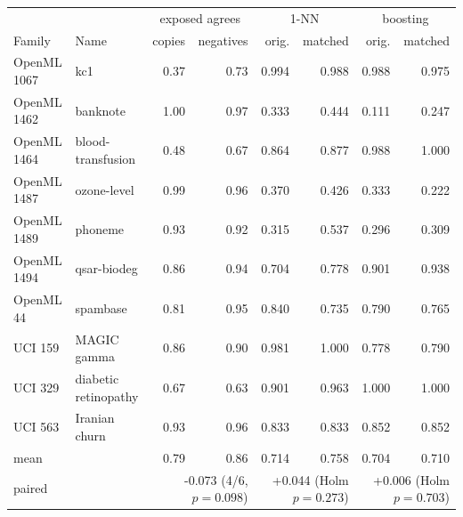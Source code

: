 \begin{tabular}{llrrrrrr}\toprule
 & & \multicolumn{2}{c}{exposed agrees} & \multicolumn{2}{c}{1-NN} & \multicolumn{2}{c}{boosting}\\
Family & Name & copies & negatives & orig. & matched & orig. & matched\\\midrule
OpenML 1067 & kc1 & 0.37 & 0.73 & 0.994 & 0.988 & 0.988 & 0.975\\
OpenML 1462 & banknote & 1.00 & 0.97 & 0.333 & 0.444 & 0.111 & 0.247\\
OpenML 1464 & blood-transfusion & 0.48 & 0.67 & 0.864 & 0.877 & 0.988 & 1.000\\
OpenML 1487 & ozone-level & 0.99 & 0.96 & 0.370 & 0.426 & 0.333 & 0.222\\
OpenML 1489 & phoneme & 0.93 & 0.92 & 0.315 & 0.537 & 0.296 & 0.309\\
OpenML 1494 & qsar-biodeg & 0.86 & 0.94 & 0.704 & 0.778 & 0.901 & 0.938\\
OpenML 44 & spambase & 0.81 & 0.95 & 0.840 & 0.735 & 0.790 & 0.765\\
UCI 159 & MAGIC gamma & 0.86 & 0.90 & 0.981 & 1.000 & 0.778 & 0.790\\
UCI 329 & diabetic retinopathy & 0.67 & 0.63 & 0.901 & 0.963 & 1.000 & 1.000\\
UCI 563 & Iranian churn & 0.93 & 0.96 & 0.833 & 0.833 & 0.852 & 0.852\\
\midrule mean & & 0.79 & 0.86 & 0.714 & 0.758 & 0.704 & 0.710\\
paired & & \multicolumn{2}{r}{-0.073 (4/6, $p=0.098$)} & \multicolumn{2}{r}{+0.044 (Holm $p=0.273$)} & \multicolumn{2}{r}{+0.006 (Holm $p=0.703$)}\\
\bottomrule\end{tabular}
